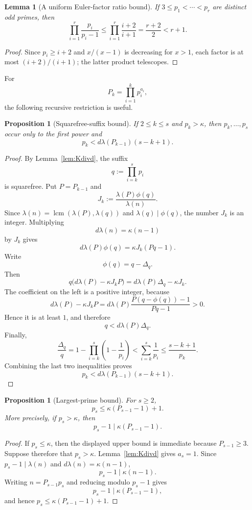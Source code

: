 \documentclass[11pt]{article}
\newtheorem{proposition}[theorem]{Proposition}
\newtheorem{lemma}[theorem]{Lemma}
\begin{document}
\begin{lemma}[A uniform Euler-factor ratio bound]
\label{lem:euler-ratio}
If $3\le p_1<\cdots<p_r$ are distinct odd primes, then
\[
\prod_{i=1}^r\frac{p_i}{p_i-1}
\le
\prod_{i=1}^r\frac{i+2}{i+1}
=
\frac{r+2}{2}
<r+1.
\]
\end{lemma}

\begin{proof}
Since $p_i\ge i+2$ and $x/(x-1)$ is decreasing for $x>1$, each factor is at
most $(i+2)/(i+1)$; the latter product telescopes.
\end{proof}

For
\[
P_k=\prod_{i=1}^k p_i^{a_i},
\]
the following recursive restriction is useful.

\begin{proposition}[Squarefree-suffix bound]
\label{prop:suffix}
If $2\le k\le s$ and $p_k>\kappa$, then
$p_k,\ldots,p_s$ occur only to the first power and
\[
p_k
<
d\lambda(P_{k-1})(s-k+1).
\]
\end{proposition}

\begin{proof}
By Lemma~\ref{lem:Kdivd}, the suffix
\[
q:=\prod_{i=k}^{s}p_i
\]
is squarefree.  Put $P=P_{k-1}$ and
\[
J_k:=\frac{\lambda(P)\phi(q)}{\lambda(n)}.
\]
Since $\lambda(n)=\operatorname{lcm}(\lambda(P),\lambda(q))$ and
$\lambda(q)\mid\phi(q)$, the number $J_k$ is an integer.  Multiplying
\[
d\lambda(n)=\kappa(n-1)
\]
by $J_k$ gives
\[
d\lambda(P)\phi(q)=\kappa J_k(Pq-1).
\]
Write
\[
\phi(q)=q-\Delta_q.
\]
Then
\[
q\bigl(d\lambda(P)-\kappa J_kP\bigr)
=
d\lambda(P)\Delta_q-\kappa J_k.
\]
The coefficient on the left is a positive integer, because
\[
d\lambda(P)-\kappa J_kP
=
d\lambda(P)
\frac{P(q-\phi(q))-1}{Pq-1}>0.
\]
Hence it is at least $1$, and therefore
\[
q<d\lambda(P)\Delta_q.
\]
Finally,
\[
\frac{\Delta_q}{q}
=
1-\prod_{i=k}^{s}\left(1-\frac1{p_i}\right)
<
\sum_{i=k}^{s}\frac1{p_i}
\le\frac{s-k+1}{p_k}.
\]
Combining the last two inequalities proves
\[
p_k<d\lambda(P_{k-1})(s-k+1).
\]
\end{proof}

\begin{proposition}[Largest-prime bound]
\label{prop:largest}
For $s\ge2$,
\[
p_s\le \kappa(P_{s-1}-1)+1.
\]
More precisely, if $p_s>\kappa$, then
\[
p_s-1\mid \kappa(P_{s-1}-1).
\]
\end{proposition}

\begin{proof}
If $p_s\le\kappa$, then the displayed upper bound is immediate because
$P_{s-1}\ge3$.  Suppose therefore that $p_s>\kappa$.  Lemma~\ref{lem:Kdivd}
gives $a_s=1$.  Since $p_s-1\mid\lambda(n)$ and
$d\lambda(n)=\kappa(n-1)$,
\[
p_s-1\mid \kappa(n-1).
\]
Writing $n=P_{s-1}p_s$ and reducing modulo $p_s-1$ gives
\[
p_s-1\mid \kappa(P_{s-1}-1),
\]
and hence $p_s\le\kappa(P_{s-1}-1)+1$.
\end{proof}
\end{document}
